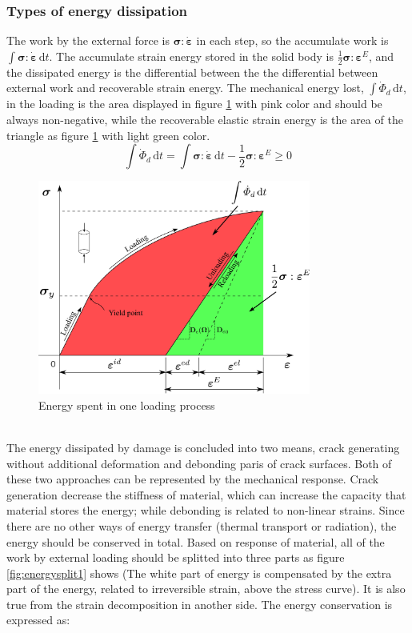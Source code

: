 \documentclass[preprint,review,12pt]{elsarticle}
\newcommand{\ud}{\textrm{d}}
\begin{document}
\subsubsection{Types of energy dissipation}
The work by the external force is $\bm\sigma:\dot{\bm\varepsilon}$ in each step, so the accumulate work is $\int \bm\sigma:\dot{\bm\varepsilon} \,\ud t$. The accumulate strain energy stored in the solid body is $\frac{1}{2}\bm\sigma:\bm\varepsilon^E$, and the dissipated energy is the differential between the the differential between external work and recoverable strain energy. The mechanical energy lost, $\int \dot\varPhi_d \, \ud t$, in the loading is the area displayed in figure \ref{fig:energylost} with pink color and should be always non-negative, while the recoverable elastic strain energy is the area of the triangle as figure \ref{fig:energylost} with light green color.
%
\begin{equation}
   \label{eq:elost}
   \int \dot\varPhi_{d} \, \ud t = \int\bm\sigma:\dot{\bm\varepsilon}\,\ud t -\frac{1}{2}\bm\sigma:\bm\varepsilon^E\ge 0
\end{equation}
%
\begin{figure}[htbp]
   \centering
  \includegraphics[width=0.8\textwidth]{inkscape/energy_lost/energy_lost2.eps}
   \caption{Energy spent in one loading process}
   \label{fig:energylost}
\end{figure}
\
\\
The energy dissipated by damage is concluded into two means, crack generating without additional deformation and debonding paris of crack surfaces. Both of these two approaches can be represented by the mechanical response. Crack generation decrease the stiffness of material, which can increase the capacity that material stores the energy; while debonding is related to non-linear strains. Since there are no other ways of energy transfer (thermal transport or radiation), the energy should be conserved in total. Based on response of material, all of the work by external loading should be splitted into three parts as figure \ref{fig:energysplit1} shows (The white part of energy is compensated by the extra part of the energy, related to irreversible strain, above the stress curve). It is also true from the strain decomposition in another side. The energy conservation is expressed as:
\end{document}
